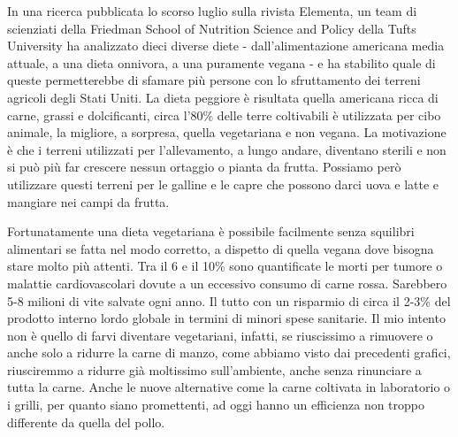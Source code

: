 \documentclass[12pt]{book} %
\begin{document}
In una ricerca pubblicata lo scorso luglio sulla rivista Elementa, un team di scienziati della Friedman School of Nutrition Science
and Policy della Tufts University ha analizzato dieci diverse diete - dall'alimentazione americana media attuale, a una
dieta onnivora, a una puramente vegana - e ha stabilito quale di queste permetterebbe di sfamare più persone con lo
sfruttamento dei terreni agricoli degli Stati Uniti. La dieta peggiore è risultata quella americana ricca di carne,
grassi e dolcificanti, circa l'80\% delle terre coltivabili è utilizzata per cibo animale, la
migliore, a sorpresa, quella vegetariana e non vegana. La motivazione è che i terreni utilizzati per
l'allevamento, a lungo andare, diventano sterili e non si può più far crescere nessun ortaggio o
pianta da frutta. Possiamo però utilizzare questi terreni per le galline e le capre che possono darci uova e latte e
mangiare nei campi da frutta.

Fortunatamente una dieta vegetariana è possibile facilmente senza squilibri alimentari se fatta nel modo corretto, a dispetto di quella vegana dove bisogna stare molto più attenti.
Tra il 6 e il 10\% sono quantificate le morti per tumore o malattie cardiovascolari dovute a un eccessivo consumo di carne rossa. Sarebbero 5-8 milioni di vite salvate ogni anno. Il tutto con un risparmio di circa il 2-3\% del prodotto interno lordo globale in termini di minori spese sanitarie.
Il mio intento non è quello di farvi diventare vegetariani, infatti, se riuscissimo a rimuovere o anche solo a ridurre la carne di manzo, come abbiamo visto dai precedenti grafici, riusciremmo a ridurre già moltissimo sull'ambiente, anche senza rinunciare a tutta la carne.
Anche le nuove alternative come la carne coltivata in laboratorio o i grilli, per quanto siano promettenti, ad oggi hanno un efficienza non troppo differente da quella del pollo.

\bigskip
\end{document}
